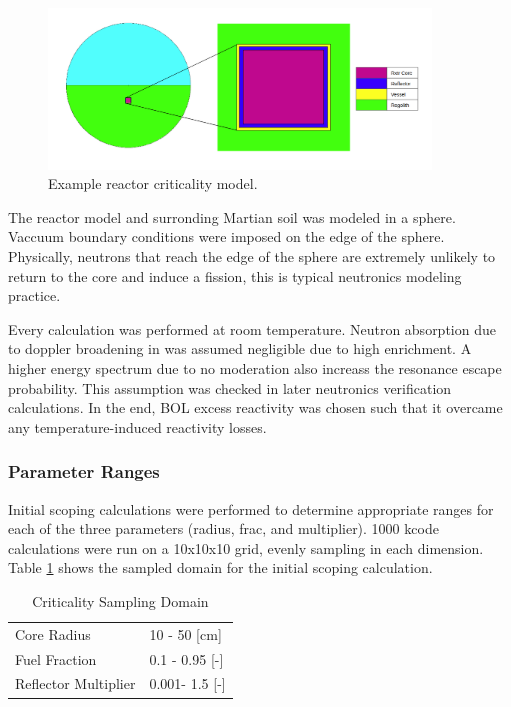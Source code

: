 \begin{figure}[h]
    \centering
    \includegraphics[width=4in]{../images/crit_model_geom.png}
\caption{Example reactor criticality model.}
\label{fig:homog_model}
\end{figure}

The reactor model and surronding Martian soil was modeled in a sphere. Vaccuum
boundary conditions were imposed on the edge of the sphere. Physically, neutrons
that reach the edge of the sphere are extremely unlikely to return to the core
and induce a fission, this is typical neutronics modeling practice.

Every \keff calculation was performed at room temperature. Neutron absorption
due to doppler broadening in 
\urantwo was assumed negligible due to high enrichment. A higher energy
spectrum due to no moderation also increass the resonance escape probability.
This assumption was checked in later neutronics verification calculations. 
In the end, BOL excess reactivity was chosen such that it overcame any 
temperature-induced reactivity losses. 

\subsubsection{Parameter Ranges}

Initial scoping calculations were performed to determine appropriate ranges for
each of the three parameters (radius, frac, and multiplier). 1000 kcode
calculations were run on a 10x10x10 grid, evenly sampling in each dimension.
Table \ref{tab:bol_criticality_1000} shows the sampled domain for the initial
scoping calculation.

\begin{table}[h]
  \centering
  \caption{Criticality Sampling Domain}
  \begin{tabular}{ll}
    \toprule
     Core Radius            		   & 10 - 50 [cm] \\
     Fuel Fraction 					   & 0.1 - 0.95 [-]\\
     Reflector Multiplier			   & 0.001- 1.5 [-]\\
  \end{tabular}
  \label{tab:bol_criticality_1000}
\end{table}

